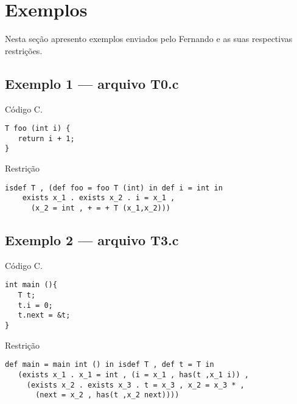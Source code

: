 \documentclass[a4paper,8pt]{article}
\begin{document}
     \section{Exemplos}

     Nesta seção apresento exemplos enviados pelo Fernando e as
     suas respectivas restrições.

     \subsection{Exemplo 1 --- arquivo T0.c}

     Código C.

     \begin{verbatim}
T foo (int i) {
   return i + 1;
}

  \end{verbatim}

     Restrição

     \begin{verbatim}
isdef T , (def foo = foo T (int) in def i = int in 
    exists x_1 . exists x_2 . i = x_1 , 
      (x_2 = int , + = + T (x_1,x_2)))
  \end{verbatim}

     \subsection{Exemplo 2 --- arquivo T3.c}

     Código C.

     \begin{verbatim}
int main (){
   T t;
   t.i = 0;
   t.next = &t;
}
  \end{verbatim}

     Restrição

     \begin{verbatim}
def main = main int () in isdef T , def t = T in  
   (exists x_1 . x_1 = int , (i = x_1 , has(t ,x_1 i)) , 
     (exists x_2 . exists x_3 . t = x_3 , x_2 = x_3 * , 
       (next = x_2 , has(t ,x_2 next))))
  \end{verbatim}
\end{document}

